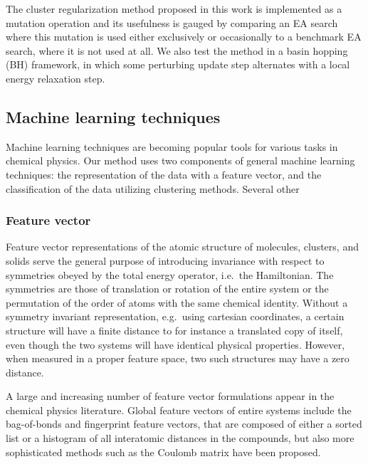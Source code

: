 \documentclass[aip,amsmath,amssymb,reprint]{revtex4-1}
\begin{document}
The cluster regularization method proposed in this work is implemented
as a mutation operation and its usefulness is gauged by comparing an
EA search where this mutation is used either exclusively or
occasionally to a benchmark EA search, where it is not used at all. We
also test the method in a basin hopping (BH) framework,\cite{wales1997} in which some
perturbing update step alternates with a local energy relaxation step.

\subsection{Machine learning techniques}
Machine learning techniques are becoming popular tools for various tasks in chemical physics.\cite{Rupp2012,Bartok2013,Hansen2013,Li2015,Botu2015,Khorshidi2016,Alexandrova2016,Schutt2017,Parkhill2017,Patra2017} Our method uses two components of general machine learning techniques:
the representation of the data with a feature vector, and the
classification of the data utilizing clustering methods. Several other 

\subsubsection{Feature vector}
Feature vector representations of the atomic structure of molecules,
clusters, and solids serve the general purpose of introducing
invariance with respect to symmetries obeyed by the total energy
operator, i.e.\ the Hamiltonian.\cite{Bartok2013} The symmetries are those of translation
or rotation of the entire system or the permutation of the order of
atoms with the same chemical identity. Without a symmetry invariant
representation, e.g.\ using cartesian coordinates, a certain structure
will have a finite distance to for instance a translated copy of
itself, even though the two systems will have identical physical
properties. However, when measured in a proper feature space, two such
structures may have a zero distance.

A large and increasing number of feature vector formulations appear in
the chemical physics literature. Global feature vectors of entire
systems include the bag-of-bonds\cite{bag_of_bonds} and fingerprint\cite{finger_print,finger_print_application} feature
vectors, that are composed of either a sorted list or a histogram of
all interatomic distances in the compounds, but also more
sophisticated methods such as the Coulomb matrix\cite{coulomb_matrix1,coulomb_matrix2} have been
proposed.
\end{document}
